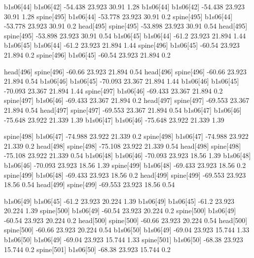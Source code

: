 b1s06[44]    b1s06[42]    -54.438    23.923    30.91    1.28
b1s06[44]    b1s06[42]    -54.438    23.923    30.91    1.28
spine[495]    b1s06[44]    -53.778    23.923    30.91    0.2
spine[495]    b1s06[44]    -53.778    23.923    30.91    0.2
head[495]    spine[495]    -53.898    23.923    30.91    0.54
head[495]    spine[495]    -53.898    23.923    30.91    0.54
b1s06[45]    b1s06[44]    -61.2    23.923    21.894    1.44
b1s06[45]    b1s06[44]    -61.2    23.923    21.894    1.44
spine[496]    b1s06[45]    -60.54    23.923    21.894    0.2
spine[496]    b1s06[45]    -60.54    23.923    21.894    0.2


head[496]    spine[496]    -60.66    23.923    21.894    0.54
head[496]    spine[496]    -60.66    23.923    21.894    0.54
b1s06[46]    b1s06[45]    -70.093    23.367    21.894    1.44
b1s06[46]    b1s06[45]    -70.093    23.367    21.894    1.44
spine[497]    b1s06[46]    -69.433    23.367    21.894    0.2
spine[497]    b1s06[46]    -69.433    23.367    21.894    0.2
head[497]    spine[497]    -69.553    23.367    21.894    0.54
head[497]    spine[497]    -69.553    23.367    21.894    0.54
b1s06[47]    b1s06[46]    -75.648    23.922    21.339    1.39
b1s06[47]    b1s06[46]    -75.648    23.922    21.339    1.39


spine[498]    b1s06[47]    -74.988    23.922    21.339    0.2
spine[498]    b1s06[47]    -74.988    23.922    21.339    0.2
head[498]    spine[498]    -75.108    23.922    21.339    0.54
head[498]    spine[498]    -75.108    23.922    21.339    0.54
b1s06[48]    b1s06[46]    -70.093    23.923    18.56    1.39
b1s06[48]    b1s06[46]    -70.093    23.923    18.56    1.39
spine[499]    b1s06[48]    -69.433    23.923    18.56    0.2
spine[499]    b1s06[48]    -69.433    23.923    18.56    0.2
head[499]    spine[499]    -69.553    23.923    18.56    0.54
head[499]    spine[499]    -69.553    23.923    18.56    0.54


b1s06[49]    b1s06[45]    -61.2    23.923    20.224    1.39
b1s06[49]    b1s06[45]    -61.2    23.923    20.224    1.39
spine[500]    b1s06[49]    -60.54    23.923    20.224    0.2
spine[500]    b1s06[49]    -60.54    23.923    20.224    0.2
head[500]    spine[500]    -60.66    23.923    20.224    0.54
head[500]    spine[500]    -60.66    23.923    20.224    0.54
b1s06[50]    b1s06[49]    -69.04    23.923    15.744    1.33
b1s06[50]    b1s06[49]    -69.04    23.923    15.744    1.33
spine[501]    b1s06[50]    -68.38    23.923    15.744    0.2
spine[501]    b1s06[50]    -68.38    23.923    15.744    0.2


